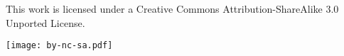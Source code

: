 \maketitle
\balance

\begin{minipage}{0.8\pagewidth}
   \begin{mdframed}[outerlinecolor=black,outerlinewidth=2pt,linecolor=cccolor,middlelinewidth=3pt,roundcorner=10pt]
     This work is licensed under a Creative Commons Attribution-ShareAlike 3.0 Unported License.
     \begin{center}
       \texttt{[image: by-nc-sa.pdf]}
     \end{center}
   \end{mdframed}
       
\end{minipage}

